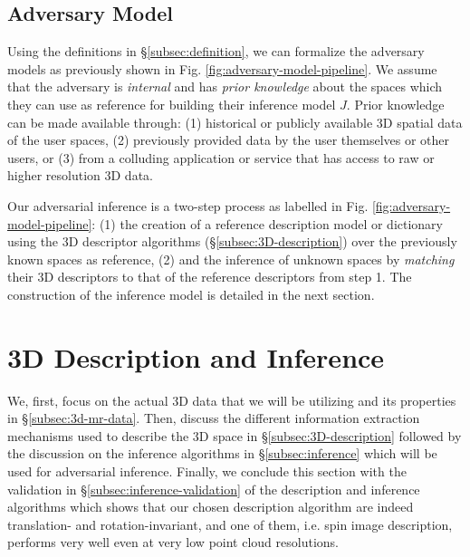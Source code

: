 \subsection{Adversary Model}\label{subsec:threat}

Using the definitions in \S\ref{subsec:definition}, we can formalize the adversary models as previously shown in Fig. \ref{fig:adversary-model-pipeline}. We assume that the adversary is \textit{internal} and has \textit{prior knowledge} about the spaces which they can use as reference for building their inference model $J$. Prior knowledge can be made available through: (1) historical or publicly available 3D spatial data of the user spaces, (2) previously provided data by the user themselves or other users, or (3) from a colluding application or service that has access to raw or higher resolution 3D data.

Our adversarial inference is a two-step process as labelled in Fig. \ref{fig:adversary-model-pipeline}: (1) the creation of a reference description model or dictionary using the 3D descriptor algorithms (\S\ref{subsec:3D-description}) over the previously known spaces as reference, (2) and the inference of unknown spaces by \textit{matching} their 3D descriptors to that of the reference descriptors from step 1. The construction of the inference model is detailed in the next section. %

\section{3D Description and Inference}\label{sec:3d-space}
We, first, focus on the actual 3D data that we will be utilizing and its properties in \S\ref{subsec:3d-mr-data}. Then, discuss the different information extraction mechanisms used to describe the 3D space in \S\ref{subsec:3D-description} followed by the discussion on the inference algorithms in \S\ref{subsec:inference} which will be used for adversarial inference. Finally, we conclude this section with the validation in \S\ref{subsec:inference-validation} of the description and inference algorithms which shows that our chosen description algorithm are indeed translation- and rotation-invariant, and one of them, i.e. spin image description, performs very well even at very low point cloud resolutions.

